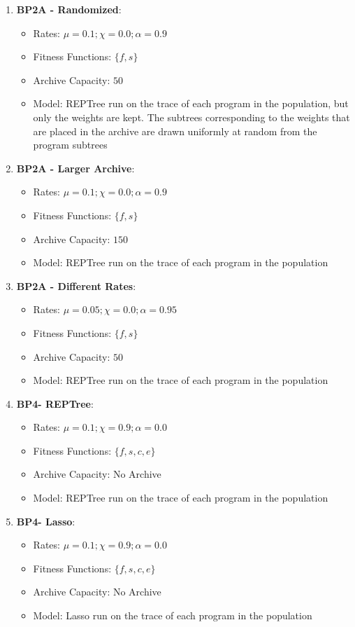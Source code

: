 \begin{enumerate}
\item \textbf{BP2A - Randomized}: 
\begin{itemize}[noitemsep]
\item Rates: $\mu = 0.1; \chi = 0.0; \alpha = 0.9$
\item Fitness Functions: $\{f, s\}$
\item Archive Capacity: $50$
\item Model: REPTree run on the trace of each program in the population, but only the weights are kept.  The subtrees corresponding to the weights that are placed in the archive are drawn uniformly at random from the program subtrees
\end{itemize}

\item \textbf{BP2A - Larger Archive}: 
\begin{itemize}[noitemsep]
\item Rates: $\mu = 0.1; \chi = 0.0; \alpha = 0.9$
\item Fitness Functions: $\{f, s\}$
\item Archive Capacity: $150$
\item Model: REPTree run on the trace of each program in the population
\end{itemize}

\item \textbf{BP2A - Different Rates}: 
\begin{itemize}[noitemsep]
\item Rates: $\mu = 0.05; \chi = 0.0; \alpha = 0.95$
\item Fitness Functions: $\{f, s\}$
\item Archive Capacity: $50$
\item Model: REPTree run on the trace of each program in the population
\end{itemize}

\item \textbf{BP4- REPTree}: 
\begin{itemize}[noitemsep]
\item Rates: $\mu = 0.1; \chi = 0.9; \alpha = 0.0$
\item Fitness Functions: $\{f, s, c, e\}$
\item Archive Capacity: No Archive
\item Model: REPTree run on the trace of each program in the population
\end{itemize}

\item \textbf{BP4- Lasso}: 
\begin{itemize}[noitemsep]
\item Rates: $\mu = 0.1; \chi = 0.9; \alpha = 0.0$
\item Fitness Functions: $\{f, s, c, e\}$
\item Archive Capacity: No Archive
\item Model: Lasso run on the trace of each program in the population
\end{itemize}


\end{enumerate}
